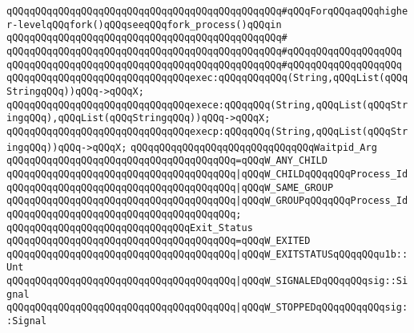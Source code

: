 \verb|qQQqqQQqqQQqqQQqqQQqqQQqqQQqqQQqqQQqqQQqqQQqqQQq#qQQqForqQQqaqQQqhigher-levelqQQqfork()qQQqseeqQQqfork_process()qQQqin|\newline
\verb|qQQqqQQqqQQqqQQqqQQqqQQqqQQqqQQqqQQqqQQqqQQqqQQq#|\newline
\verb|qQQqqQQqqQQqqQQqqQQqqQQqqQQqqQQqqQQqqQQqqQQqqQQq#qQQqqQQqqQQqqQQqqQQq|\newline
\verb|qQQqqQQqqQQqqQQqqQQqqQQqqQQqqQQqqQQqqQQqqQQqqQQq#qQQqqQQqqQQqqQQqqQQq|\newline
\newline
\verb|qQQqqQQqqQQqqQQqqQQqqQQqqQQqqQQqexec:qQQqqQQqqQQq(String,qQQqList(qQQqStringqQQq))qQQq->qQQqX;|\newline
\verb|qQQqqQQqqQQqqQQqqQQqqQQqqQQqqQQqexece:qQQqqQQq(String,qQQqList(qQQqStringqQQq),qQQqList(qQQqStringqQQq))qQQq->qQQqX;|\newline
\verb|qQQqqQQqqQQqqQQqqQQqqQQqqQQqqQQqexecp:qQQqqQQq(String,qQQqList(qQQqStringqQQq))qQQq->qQQqX;|\newline
\newline
\verb|qQQqqQQqqQQqqQQqqQQqqQQqqQQqqQQqWaitpid_Arg|\newline
\verb|qQQqqQQqqQQqqQQqqQQqqQQqqQQqqQQqqQQqqQQq=qQQqW_ANY_CHILD|\newline
\verb|qQQqqQQqqQQqqQQqqQQqqQQqqQQqqQQqqQQqqQQq|\verb#|qQQqW_CHILDqQQqqQQqProcess_Id#\newline
\verb|qQQqqQQqqQQqqQQqqQQqqQQqqQQqqQQqqQQqqQQq|\verb#|qQQqW_SAME_GROUP#\newline
\verb|qQQqqQQqqQQqqQQqqQQqqQQqqQQqqQQqqQQqqQQq|\verb#|qQQqW_GROUPqQQqqQQqProcess_Id#\newline
\verb|qQQqqQQqqQQqqQQqqQQqqQQqqQQqqQQqqQQqqQQq;|\newline
\newline
\verb|qQQqqQQqqQQqqQQqqQQqqQQqqQQqqQQqExit_Status|\newline
\verb|qQQqqQQqqQQqqQQqqQQqqQQqqQQqqQQqqQQqqQQq=qQQqW_EXITED|\newline
\verb|qQQqqQQqqQQqqQQqqQQqqQQqqQQqqQQqqQQqqQQq|\verb#|qQQqW_EXITSTATUSqQQqqQQqu1b::Unt#\newline
\verb|qQQqqQQqqQQqqQQqqQQqqQQqqQQqqQQqqQQqqQQq|\verb#|qQQqW_SIGNALEDqQQqqQQqsig::Signal#\newline
\verb|qQQqqQQqqQQqqQQqqQQqqQQqqQQqqQQqqQQqqQQq|\verb#|qQQqW_STOPPEDqQQqqQQqqQQqsig::Signal#\newline
